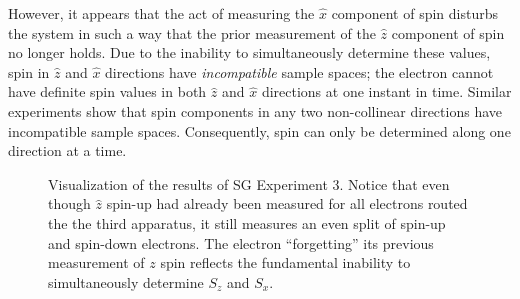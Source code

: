 However, it appears that the act of measuring the $\hat{x}$ component of spin disturbs the system in such a way that the prior measurement of the $\hat{z}$ component of spin no longer holds. Due to the inability to simultaneously determine these values, spin in $\hat{z}$ and $\hat{x}$ directions have \textit{incompatible} sample spaces; the electron cannot have definite spin values in both $\hat{z}$ and $\hat{x}$ directions at one instant in time. Similar experiments show that spin components in any two non-collinear directions have incompatible sample spaces. Consequently, spin can only be determined along one direction at a time.

\begin{figure}
\centering\CaptionFontSize
{}

\caption[Results of Stern-Gerlach Experiment 3]
{Visualization of the results of SG Experiment 3. Notice that even though $\hat{z}$ spin-up had already been measured for all electrons routed the the third apparatus, it still measures an even split of spin-up and spin-down electrons. The electron ``forgetting'' its previous measurement of $z$ spin reflects the fundamental inability to simultaneously determine $S_z$ and $S_x$.}
\label{Figure:Exp 3}
\end{figure}
